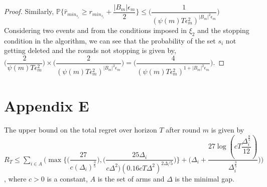 \begin{proof}
\newline Similarly, $\mathbb{P}\lbrace\hat{r}_{min_{s_{i}}}\geq r_{min_{s_{i}}} + \dfrac{|B_{m}|\epsilon_{m}}{2}\rbrace\leq \bigg(\dfrac{1}{(\psi(m)T\epsilon_{m}^{2})^{|B_{m}|^{2}\epsilon_{m}}}\bigg)$
\newline Considering two events and from the conditions imposed in $\xi_{2}$ and the stopping condition in the algorithm, we can see that the probability of the set $s_{i}$ not getting deleted and the rounds not stopping is given by,
\newline
\hspace*{2em}$\bigg(\dfrac{2}{\psi(m)T\epsilon_{m}^{2}}\bigg)\times\bigg(\dfrac{2}{(\psi(m)T\epsilon_{m}^{2})^{|B_{m}|^{2}\epsilon_{m}}}\bigg)=\bigg(\dfrac{4}{(\psi(m)T\epsilon_{m}^{2})^{1+|B_{m}|^{2}\epsilon_{m}}}\bigg)$.
\end{proof}

\section*{Appendix E}
\begin{theorem}
The upper bound on the total regret over horizon $T$ after round $m$ is given by $R_{T}\leq \sum_{i\in A}\bigg (\max{\bigg\lbrace \bigg(\dfrac{27}{c(\Delta_{i})^{\frac{3}{5}}}\bigg) ,\bigg(\dfrac{25\Delta_{i}}{c\Delta^{2})(0.16cT\Delta^{2})^{2\Delta/5}}\bigg)\bigg\rbrace} + \bigg(\Delta_{i}+\dfrac{27\log{(cT\dfrac{\Delta_{i}^{\frac{8}{5}}}{12})}}{\Delta_{i}^{\frac{3}{5}}}\bigg)\bigg)$, where $c>0$ is a constant, $A$ is the set of arms and $\Delta$ is the minimal gap.
\end{theorem}

